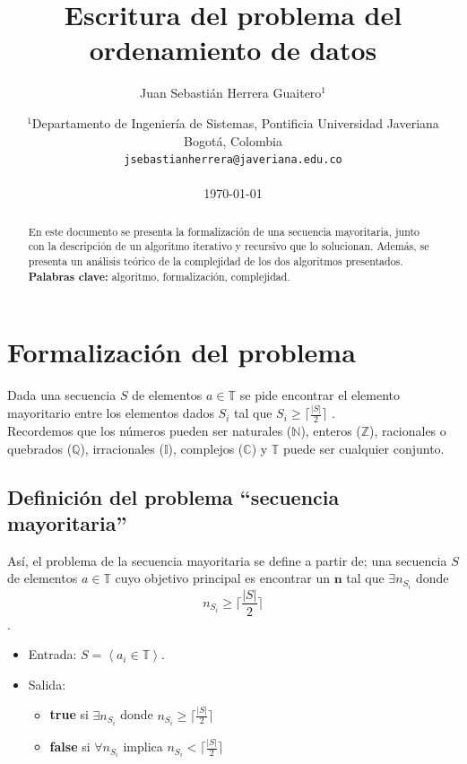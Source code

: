 \documentclass[]{article}
\title{Escritura del problema del ordenamiento de datos}
\author{Juan Sebastián Herrera Guaitero$^1$}
\date{
	$^1$Departamento de Ingeniería de Sistemas, Pontificia Universidad Javeriana\\Bogotá,  Colombia \\
	\texttt{jsebastianherrera@javeriana.edu.co}\\~\\
	\today
}
\begin{document}
\maketitle

\begin{abstract}
    En este documento se presenta la formalización de una secuencia mayoritaria, junto con la descripción de un algoritmo iterativo y recursivo que lo solucionan. Además, se presenta un análisis teórico de la complejidad de los dos algoritmos presentados.
    \textbf{Palabras clave:}  algoritmo, formalización, complejidad.
\end{abstract}

\tableofcontents
\section{Formalización del problema} \label{formalizacion}
Dada una secuencia $S$ de elementos $a\in \mathbb{T}$ se pide encontrar el elemento mayoritario entre los elementos dados $S_i$  tal que  $S_i  \geq  \lceil \frac{|S|}{2} \rceil$  .\\
Recordemos que los números pueden ser naturales ($\mathbb{N}$), enteros ($\mathbb{Z}$), racionales o quebrados ($\mathbb{Q}$), irracionales ($\mathbb{I}$), complejos ($\mathbb{C}$) y  $\mathbb{T}$ puede ser cualquier conjunto.

\subsection{Definición del problema ``secuencia mayoritaria''} \label{problema}
Así, el problema de la secuencia mayoritaria se define a partir de;
una secuencia $S$ de elementos $a\in \mathbb{T}$  cuyo objetivo principal es encontrar un $\textbf{n}$ tal que $\exists n_{S_i}$ donde $$n_{S_i} \geq  \lceil \frac{|S|}{2} \rceil$$  .
\begin{itemize}
    \item Entrada:
          $S = \left< a_i \in \mathbb{T} \right> $.
    \item Salida:
          \begin{itemize}
              \item \textbf{true} si $\exists n_{S_i}$ donde $n_{S_i} \geq \lceil \frac{|S|}{2} \rceil$
              \item \textbf{false} si $\forall n_{S_i}$ implica $n_{S_i} <  \lceil \frac{|S|}{2} \rceil$
          \end{itemize}
\end{itemize}
\end{document}
